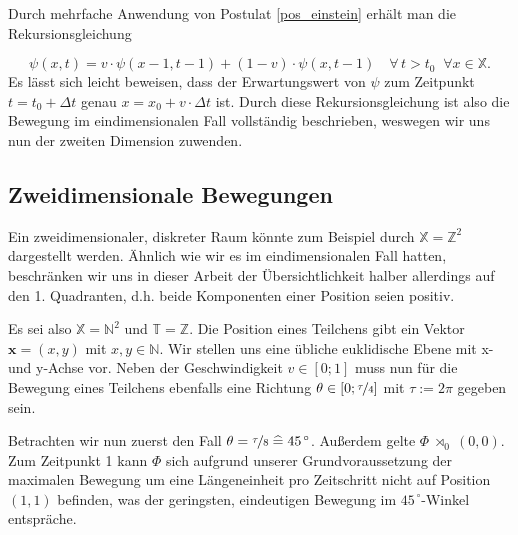 \documentclass[a4paper,12pt,ngerman]{scrartcl}
\theoremstyle{plain}
\theoremstyle{plain}
\theoremstyle{plain}
\theoremstyle{plain}
\newcommand{\Z}{\mathbb{Z}}
\newcommand{\T}{\mathbb{T}}
\newcommand{\X}{\mathbb{X}}
\newcommand{\N}{\mathbb{N}}
\newcommand{\at}[1]{\;\rtimes_{#1}\;}
\begin{document}
Durch mehrfache Anwendung von Postulat \ref{pos_einstein} erhält man die Rekursionsgleichung

{
\[\psi(x,t)=v\cdot\psi(x-1,t-1)+(1-v)\cdot\psi(x,t-1) \quad\forall\, t>t_0 \;\;\forall x\in\X.\]
}
Es lässt sich leicht beweisen, dass der Erwartungswert von $\psi$ zum Zeitpunkt $t=t_0+\Delta t$ genau $x=x_0+v\cdot\Delta t$ ist. Durch diese Rekursionsgleichung ist also die Bewegung im eindimensionalen Fall vollständig beschrieben, weswegen wir uns nun der zweiten Dimension zuwenden.



\subsection{Zweidimensionale Bewegungen}

Ein zweidimensionaler, diskreter Raum könnte zum Beispiel durch $\X=\Z^2$ dargestellt werden. Ähnlich wie wir es im eindimensionalen Fall hatten, beschränken wir uns in dieser Arbeit der Übersichtlichkeit halber allerdings auf den 1. Quadranten, d.h. beide Komponenten einer Position seien positiv. 

Es sei also $\X=\N^2$ und $\T=\Z$. Die Position eines Teilchens gibt ein Vektor $\pmb{x}=(x,y)$ mit $x,y\in\N$. Wir stellen uns eine übliche euklidische Ebene mit x- und y-Achse vor. Neben der Geschwindigkeit $v\in[0;1]$ muss nun für die Bewegung eines Teilchens ebenfalls eine Richtung $\theta\in[0;\nicefrac{\tau}{4}]$ mit $\tau:=2\pi$ gegeben sein.

Betrachten wir nun zuerst den Fall $\theta=\nicefrac{\tau}{8}\;\widehat{=}\;45^{\,\circ}$. Außerdem gelte $\Phi\at{0} (0,0)$. Zum Zeitpunkt 1 kann $\Phi$ sich aufgrund unserer Grundvoraussetzung der maximalen Bewegung um eine Längeneinheit pro Zeitschritt nicht auf Position $(1,1)$ befinden, was der geringsten, eindeutigen Bewegung im $45^{\,\circ}$-Winkel entspräche.
\end{document}
